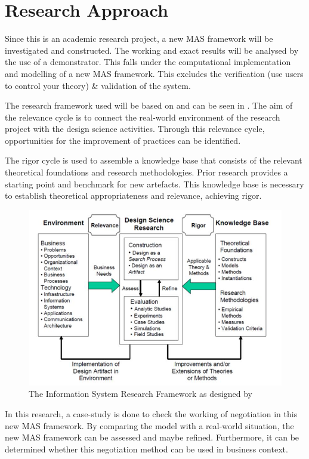 \section{Research Approach}
Since this is an academic research project, a new MAS framework will be investigated and constructed. The working and exact results will be analysed by the use of a demonstrator. This falls under the computational implementation and modelling of a new MAS framework. This excludes the verification (use users to control your theory) \& validation of the system.  

The research framework used will be based on \cite{hevner2010design} and can be seen in . The aim of the relevance cycle is to connect the real-world environment of the research project with the design science activities. Through this relevance cycle, opportunities for the improvement of practices can be identified.

The rigor cycle is used to assemble a knowledge base that consists of the relevant theoretical foundations and research methodologies. Prior research provides a starting point and benchmark for new artefacts. This knowledge base is necessary to establish theoretical appropriateness and relevance, achieving rigor.

\begin{figure}
	\centering
	\includegraphics[width=0.7\linewidth]{./img/InformationSystemResearchFramework.jpg}
	\caption{The Information System Research Framework as designed by \cite{hevner2010design}}
	\label{fig:InformationSystemResearchFramework}
\end{figure}

In this research, a case-study is done to check the working of negotiation in this new MAS framework. By comparing the model with a real-world situation, the new MAS framework can be assessed and maybe refined. Furthermore, it can be determined whether this negotiation method can be used in business context.

